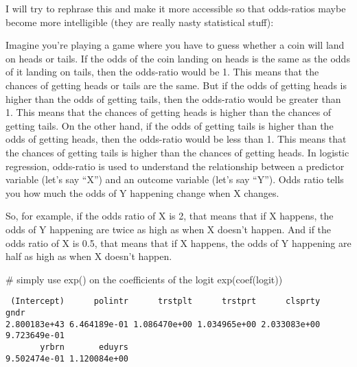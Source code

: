 \documentclass[
  letterpaper,
  DIV=11,
  numbers=noendperiod]{scrreprt}
\newenvironment{Shaded}{\begin{snugshade}}{\end{snugshade}}
\newcommand{\CommentTok}[1]{\textcolor[rgb]{0.37,0.37,0.37}{#1}}
\newcommand{\FunctionTok}[1]{\textcolor[rgb]{0.28,0.35,0.67}{#1}}
\newcommand{\NormalTok}[1]{\textcolor[rgb]{0.00,0.23,0.31}{#1}}
\newcommand{\SpecialCharTok}[1]{\textcolor[rgb]{0.37,0.37,0.37}{#1}}
\begin{document}
I will try to rephrase this and make it more accessible so that
odds-ratios maybe become more intelligible (they are really nasty
statistical stuff):

Imagine you're playing a game where you have to guess whether a coin
will land on heads or tails. If the odds of the coin landing on heads is
the same as the odds of it landing on tails, then the odds-ratio would
be 1. This means that the chances of getting heads or tails are the
same. But if the odds of getting heads is higher than the odds of
getting tails, then the odds-ratio would be greater than 1. This means
that the chances of getting heads is higher than the chances of getting
tails. On the other hand, if the odds of getting tails is higher than
the odds of getting heads, then the odds-ratio would be less than 1.
This means that the chances of getting tails is higher than the chances
of getting heads. In logistic regression, odds-ratio is used to
understand the relationship between a predictor variable (let's say
``X'') and an outcome variable (let's say ``Y''). Odds ratio tells you
how much the odds of Y happening change when X changes.

So, for example, if the odds ratio of X is 2, that means that if X
happens, the odds of Y happening are twice as high as when X doesn't
happen. And if the odds ratio of X is 0.5, that means that if X happens,
the odds of Y happening are half as high as when X doesn't happen.

\begin{Shaded}
\begin{Highlighting}[]
\CommentTok{\# simply use exp() on the coefficients of the logit}
\FunctionTok{exp}\NormalTok{(}\FunctionTok{coef}\NormalTok{(logit))}
\end{Highlighting}
\end{Shaded}

\begin{verbatim}
 (Intercept)      polintr      trstplt      trstprt      clsprty         gndr 
2.800183e+43 6.464189e-01 1.086470e+00 1.034965e+00 2.033083e+00 9.723649e-01 
       yrbrn       eduyrs 
9.502474e-01 1.120084e+00 
\end{verbatim}

\begin{Shaded}
\end{Shaded}
\end{document}
